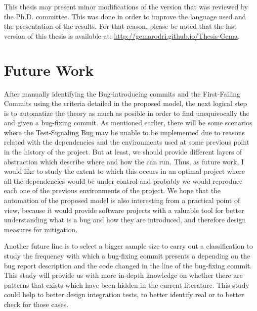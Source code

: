 \documentclass[a4paper, 12pt]{book}
\begin{document}


This thesis may present minor modifications of the version that was reviewed by the Ph.D. committee. This was done in order to improve the language used and the presentation of the results. For that reason, please be noted that the last version of this thesis is available at: \url{http://gemarodri.github.io/Thesis-Gema}. 

\section{Future Work}
\label{sec:future}

After manually identifying the Bug-introducing commits and the First-Failing Commits using the criteria detailed in the proposed model, the next logical step is to automatize the  theory as much as posible  in order to find unequivocally the \BIC and \FFC given a bug-fixing commit. As mentioned earlier, there will be some scenarios where the Test-Signaling Bug may be unable to be implemented due to reasons related with the dependencies and the environments used at some previous point in the history of the project. But at least, we should provide different layers of abstraction which describe where and how the \TSB can run. Thus, as future work, I would like to study the extent to which this occurs in an optimal project where all the dependencies would be under control and probably we would reproduce each one of the previous environments of the project. We hope that the automation of the proposed model is also interesting from a practical point of view, because it  would provide software projects with a valuable tool for better understanding what is a bug and how they are introduced, and therefore design measures for mitigation.

Another future line is to select a bigger sample size to carry out a classification to study the frequency with which a bug-fixing commit presents a \BIC depending on the bug report description and the code changed in the line of the bug-fixing commit. This study will provide us with more in-depth knowledge on whether there are patterns that exists which have been hidden in the current literature. This study could help to better design integration tests, to better identify real \BIC or to better check for those cases.
\end{document}
